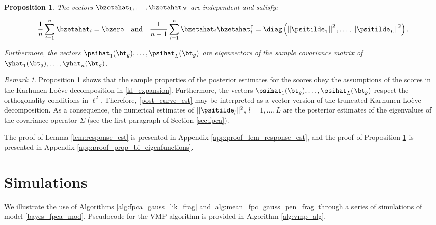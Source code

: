 \documentclass[12pt]{article}
\theoremstyle{plain}
\newtheorem{proposition}[theorem]{Proposition}
\theoremstyle{definition}
\theoremstyle{remark}
\newtheorem*{remark}{Remark}
\begin{document}
\begin{proposition}
	
	The vectors $\bzetahat_1, \dots, \bzetahat_N$ are independent and satisfy:
	
	\[
		\frac{1}{n} \sum_{i=1}^n \bzetahat_i = \bzero \quad
		\text{and} \quad
		\frac{1}{n-1} \sum_{i=1}^n \bzetahat_i \bzetahat^{\intercal}_i = \diag \left(
			\left|\left| \psitilde_1 \right|\right|^2, \dots, \left|\left| \psitilde_L \right|\right|^2
		\right).
	\]
	
	\noindent Furthermore, the vectors $\psihat_1 (\bt_g), \dots, \psihat_L (\bt_g)$ are eigenvectors of the sample
	covariance matrix of $\yhat_1 (\bt_g), \dots, \yhat_n (\bt_g)$.
	
\label{prop:bi_orthogonal}
\end{proposition}

\begin{remark}
	
	Proposition \ref{prop:bi_orthogonal} shows that the sample properties of the posterior estimates for the scores
	obey the assumptions of the scores in the Karhunen-Lo\`{e}ve decomposition in \eqref{kl_expansion}.
	Furthermore, the vectors $\psihat_1 (\bt_g), \dots, \psihat_L (\bt_g)$ respect the orthogonality conditions in $\ell^2$.
	Therefore, \eqref{post_curve_est} may be interpreted as a vector version of the truncated
	Karhunen-Lo\`{e}ve decomposition. As a consequence, the numerical estimates of
	$|| \psitilde_l ||^2$, $l = 1, \dots, L$ are the posterior estimates of the eigenvalues of the covariance operator
	$\Sigma$ (see the first paragraph of Section \ref{sec:fpca}).
	
\end{remark}

\noindent The proof of Lemma \ref{lem:response_est} is presented in Appendix \ref{app:proof_lem_response_est},
and the proof of Proposition \ref{prop:bi_orthogonal} is presented in Appendix \ref{app:proof_prop_bi_eigenfunctions}.


\section{Simulations}
\label{sec:sims}

We illustrate the use of Algorithms \ref{alg:fpca_gauss_lik_frag} and \ref{alg:mean_fpc_gauss_pen_frag}
through a series of simulations of model \eqref{bayes_fpca_mod}. Pseudocode for the VMP algorithm is
provided in Algorithm \ref{alg:vmp_alg}.
\end{document}

